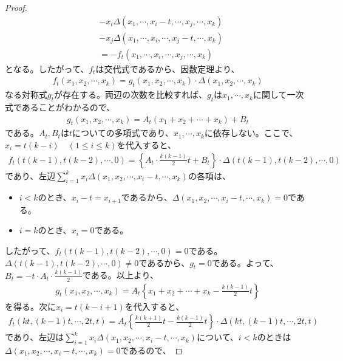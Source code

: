 \documentclass[a4paper,11pt]{jsarticle}
\theoremstyle{plain}
\theoremstyle{definition}
\renewcommand{\(}{\left(}
\renewcommand{\)}{\right)}
\renewcommand{\[}{\left[}
\renewcommand{\]}{\right]}
\renewcommand{\{}{\left\lbrace}
\renewcommand{\}}{\right\rbrace}
\begin{document}
\begin{proof}
\begin{align*}
        &- x_i \Delta(x_1, \cdots, x_i- t,\cdots, x_j,\cdots, x_k) \\
        &- x_j \Delta(x_1, \cdots, x_i,\cdots, x_j - t,\cdots, x_k) \\
        &= - f_t(x_1, \cdots,x_i ,\cdots, x_j,\cdots, x_k)
    \end{align*}
    となる。したがって、$f_t$は交代式であるから、因数定理より、
    \begin{align*}
        f_t(x_1, x_2, \cdots, x_k) = g_t(x_1,x_2,\cdots,x_k) \cdot \Delta(x_1, x_2, \cdots, x_k)
    \end{align*}
    なる対称式$g_t$が存在する。両辺の次数を比較すれば、$g_t$は$x_1, \cdots, x_k$に関して一次式であることがわかるので、
    \begin{align*}
        g_t(x_1, x_2, \cdots, x_k) = A_t (x_1 + x_2 + \cdots + x_k) + B_t
    \end{align*}
    である。$A_t,B_t$は$t$についての多項式であり、$x_1, \cdots, x_k$に依存しない。ここで、$x_i = t(k-i) \quad (1 \leq i \leq k)$を代入すると、
    \begin{align*}
        f_t(t(k-1), t(k-2), \cdots, 0) = \{A_t \cdot \frac{k(k-1)}{2}t + B_t\} \cdot \Delta(t(k-1), t(k-2), \cdots, 0)
    \end{align*}
    であり、左辺$\displaystyle \sum_{i=1}^{k} x_i \Delta(x_1, x_2, \cdots, x_i - t, \cdots, x_k)$の各項は、
    \begin{itemize}
        \item $i < k$のとき、$x_i - t = x_{i+1}$であるから、$\Delta(x_1, x_2, \cdots, x_i - t, \cdots, x_k) = 0$である。
        \item $i = k$のとき、$x_i = 0$である。
    \end{itemize}
    したがって、$f_t(t(k-1), t(k-2), \cdots, 0) = 0$である。$\Delta(t(k-1), t(k-2), \cdots, 0) \neq 0$であるから、$g_t = 0$である。よって、
    $B_t = -t \cdot A_t \cdot \frac{k(k-1)}{2}$である。以上より、
    \begin{align*}
        g_t(x_1, x_2, \cdots, x_k) = A_t \{x_1 + x_2 + \cdots + x_k - \frac{k(k-1)}{2} t \}
    \end{align*}
    を得る。次に$x_i = t(k-i+1)$を代入すると、
    \begin{align*}
        f_t(kt, (k-1)t, \cdots, 2t, t) = A_t \{\frac{k(k+1)}{2} t - \frac{k(k-1)}{2} t \} \cdot \Delta(kt, (k-1)t, \cdots, 2t, t)
    \end{align*}
    であり、左辺は$\displaystyle \sum_{i=1}^{k} x_i \Delta(x_1, x_2, \cdots, x_i - t, \cdots, x_k)$について、$i<k$のときは$\Delta(x_1, x_2, \cdots, x_i - t, \cdots, x_k) = 0$であるので、

\end{proof}
\end{document}
